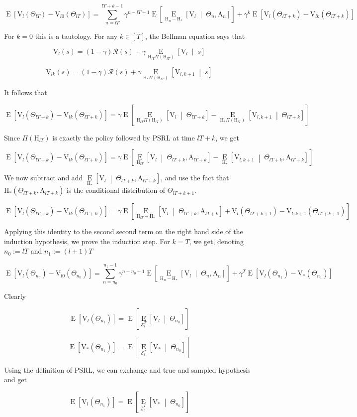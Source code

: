 \documentclass[a4paper]{article}
\newcommand{\AP}[1]{\left(#1\right)}
\newcommand{\AB}[1]{\left[#1\right]}
\newcommand{\ABM}[2]{\left[#1\;\middle\vert\;#2\right]}
\newcommand{\Ea}[2]{\underset{#1}{\operatorname{E}}\AB{#2}}
\newcommand{\CE}[3]{\underset{#1}{\operatorname{E}}\ABM{#2}{#3}}
\newcommand{\R}{\mathcal{R}}
\newcommand{\V}{\mathrm{V}}
\newcommand{\AT}{\mathrm{A}}
\newcommand{\THy}{\mathrm{H}_*}
\newcommand{\SHy}{\mathrm{H}}
\newcommand{\Ev}{\mathcal{E}}
\begin{document}
$$\Ea{}{\V_{l}\AP{\Theta_{lT}}-\V_{l0}\AP{\Theta_{lT}}}=\sum_{n=lT}^{lT+k-1}\gamma^{n-lT+1}\Ea{}{\CE{\SHy_n-\THy}{\V_{l}}{\Theta_n,\AT_n}}+\gamma^k\Ea{}{\V_{l}\AP{\Theta_{lT+k}}-\V_{lk}\AP{\Theta_{lT+k}}}$$

For $k=0$ this is a tautology. For any $k\in[T]$, the Bellman equation says that

$$\V_l(s)=(1-\gamma)\R(s)+\gamma\CE{\SHy_{lT}\Pi\AP{\SHy_{lT}}}{\V_l}{s}$$

$$\V_{lk}(s)=(1-\gamma)\R(s)+\gamma\CE{\SHy_{*}\Pi\AP{\SHy_{lT}}}{\V_{l,k+1}}{s}$$

It follows that

$$\Ea{}{\V_{l}\AP{\Theta_{lT+k}}-\V_{lk}\AP{\Theta_{lT+k}}}=\gamma\Ea{}{\CE{\SHy_{lT}\Pi\AP{\SHy_{lT}}}{\V_l}{\Theta_{lT+k}}-\CE{\SHy_{*}\Pi\AP{\SHy_{lT}}}{\V_{l,k+1}}{\Theta_{lT+k}}}$$

Since $\Pi\AP{\SHy_{lT}}$ is exactly the policy followed by PSRL at time $lT+k$, we get

$$\Ea{}{\V_{l}\AP{\Theta_{lT+k}}-\V_{lk}\AP{\Theta_{lT+k}}}=\gamma\Ea{}{\CE{\SHy_{lT}}{\V_l}{\Theta_{lT+k},\AT_{lT+k}}-\CE{\SHy_{*}}{\V_{l,k+1}}{\Theta_{lT+k},\AT_{lT+k}}}$$

We now subtract and add $\CE{\SHy_*}{\V_l}{\Theta_{lT+k},\AT_{lT+k}}$, and use the fact that $\SHy_*\AP{\Theta_{lT+k},\AT_{lT+k}}$ is the conditional distribution of $\Theta_{lT+k+1}$.

$$\Ea{}{\V_{l}\AP{\Theta_{lT+k}}-\V_{lk}\AP{\Theta_{lT+k}}}=\gamma\Ea{}{\CE{\SHy_{lT}-\SHy_{*}}{\V_l}{\Theta_{lT+k},\AT_{lT+k}}+\V_l\AP{\Theta_{lT+k+1}}-\V_{l,k+1}\AP{\Theta_{lT+k+1}}}$$

Applying this identity to the second second term on the right hand side of the induction hypothesis, we prove the induction step. For $k=T$, we get, denoting $n_0:=lT$ and $n_1:=(l+1)T$

$$\Ea{}{\V_{l}\AP{\Theta_{n_0}}-\V_{l0}\AP{\Theta_{n_0}}}=\sum_{n=n_0}^{n_1-1}\gamma^{n-n_0+1}\Ea{}{\CE{\SHy_n-\THy}{\V_{l}}{\Theta_n,\AT_n}}+\gamma^T\Ea{}{\V_{l}\AP{\Theta_{n_1}}-\V_{*}\AP{\Theta_{n_1}}}$$

Clearly 

$$\Ea{}{\V_l\AP{\Theta_{n_1}}}=\Ea{}{\CE{\Ev_l^T}{\V_l}{\Theta_{n_0}}}$$

$$\Ea{}{\V_*\AP{\Theta_{n_1}}}=\Ea{}{\CE{\Ev_l^T}{\V_*}{\Theta_{n_0}}}$$

Using the definition of PSRL, we can exchange and true and sampled hypothesis and get

$$\Ea{}{\V_l\AP{\Theta_{n_1}}}=\Ea{}{\CE{\bar{\Ev}_l^T}{\V_*}{\Theta_{n_0}}}$$
\end{document}
